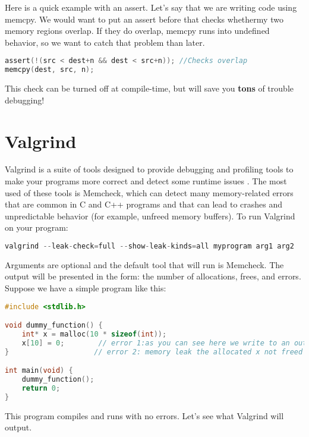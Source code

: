 Here is a quick example with an assert.
Let's say that we are writing code using memcpy.
We would want to put an assert before that checks whethermy two memory regions overlap.
If they do overlap, memcpy runs into undefined behavior, so we want to catch that problem than later.

\begin{lstlisting}[language=C]
assert(!(src < dest+n && dest < src+n)); //Checks overlap
memcpy(dest, src, n);
\end{lstlisting}

This check can be turned off at compile-time, but will save you \textbf{tons} of trouble debugging!

\section{Valgrind}

Valgrind is a suite of tools designed to provide debugging and profiling tools to make your programs more correct and detect some runtime issues \cite{valgrind}.
The most used of these tools is Memcheck, which can detect many memory-related errors that are common in C and C++ programs and that can lead to crashes and unpredictable behavior (for example, unfreed memory buffers).
To run Valgrind on your program:

\begin{lstlisting}[language=C]
valgrind --leak-check=full --show-leak-kinds=all myprogram arg1 arg2
\end{lstlisting}

Arguments are optional and the default tool that will run is Memcheck.
The output will be presented in the form: the number of allocations, frees, and errors.
Suppose we have a simple program like this:

\begin{lstlisting}[language=C]
#include <stdlib.h>

void dummy_function() {
	int* x = malloc(10 * sizeof(int));
	x[10] = 0;        // error 1:as you can see here we write to an out of bound memory address
}                    // error 2: memory leak the allocated x not freed

int main(void) {
	dummy_function();
	return 0;
}
\end{lstlisting}

This program compiles and runs with no errors.
Let's see what Valgrind will output.

